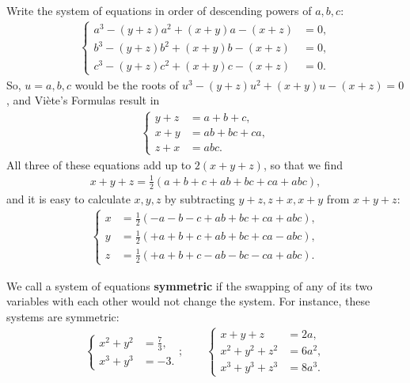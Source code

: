 \begin{solution}
    Write the system of equations in order of descending powers of $a,b,c$:
    \begin{align*}
        \begin{cases}
            a^3-(y+z)a^2+(x+y)a-(x+z) &= 0,\\b^3-(y+z)b^2+(x+y)b-(x+z) &= 0,\\c^3-(y+z)c^2+(x+y)c-(x+z) &= 0.
        \end{cases}
    \end{align*}
        So, $u=a,b,c$ would be the roots of $u^3-(y+z)u^2+(x+y)u-(x+z)=0$, and Viète's Formulas result in
        \begin{align*}
            \begin{cases}
                y+z &= a+b+c,\\ x+y &= ab+bc+ca,\\ z+x &= abc. 
            \end{cases}
        \end{align*}
        All three of these equations add up to $2(x+y+z)$, so that we find
        \begin{align*}
            x+y+z = \frac{1}{2}\left(a+b+c+ab+bc+ca+abc\right),
        \end{align*}
        and it is easy to calculate $x,y,z$ by subtracting $y+z, z+x, x+y$ from $x+y+z$:
        \begin{align*}
            \begin{cases}
                x &= \frac{1}{2}\left(-a-b-c+ab+bc+ca+abc\right),\\
                y &= \frac{1}{2}\left(+a+b+c+ab+bc+ca-abc\right),\\
                z &= \frac{1}{2}\left(+a+b+c-ab-bc-ca+abc\right).
            \end{cases}
        \end{align*}
\end{solution}

\begin{tcolorbox}
    \begin{definition}
        We call a system of equations \textbf{symmetric} if the swapping of any of its two variables with each other would not change the system. For instance, these systems are symmetric:
        \begin{align*}
            \begin{cases}
                x^2+y^2 &=\frac{7}{3},\\x^3+y^3 &=-3.
            \end{cases}; \qquad
            \begin{cases}
                x+y+z &= 2a,\\ x^2+y^2+z^2 &=6a^2,\\ x^3+y^3+z^3 &= 8a^3.
            \end{cases}
        \end{align*}
    \end{definition}
\end{tcolorbox}

